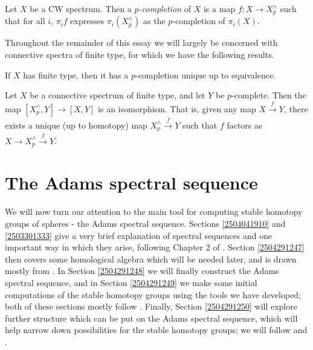 \documentclass{MetricNotes2023}
\begin{document}
\begin{definition}
Let \(X\) be a CW spectrum. Then a \textit{\(p\)-completion} of \(X\) is a map \(f : X \to X^\wedge_p\) such that for all \(i\), \(\pi_if\) expresses \(\pi_i(X^\wedge_p)\) as the \(p\)-completion of \(\pi_i(X)\).
\end{definition}

Throughout the remainder of this essay we will largely be concerned with connective spectra of finite type, for which we have the following results.

\begin{theorem}
If \(X\) has finite type, then it has a \(p\)-completion unique up to equivalence. 
\end{theorem}

\begin{theorem}\label{2504180925}
Let \(X\) be a connective spectrum of finite type, and let \(Y\) be \(p\)-complete. Then the map \([X^\wedge_p, Y]\to [X, Y]\) is an isomorphism. That is, given any map \(X \xrightarrow{f} Y\), there exists a unique (up to homotopy) map \(X^\wedge_p \xrightarrow{\overline f} Y\) such that \(f\) factors as \(X \to X^\wedge_p \xrightarrow{\overline f} Y\). 
\end{theorem}

\section{The Adams spectral sequence}

We will now turn our attention to the main tool for computing stable homotopy groups of spheres - the Adams spectral sequence. Sections \ref{2504041910} and \ref{2503301333} give a very brief explanation of spectral sequences and one important way in which they arise, following Chapter 2 of \autocite{spectral_sequences}. Section \ref{2504291247} then covers some homological algebra which will be needed later, and is drawn mostly from \autocite{weibel}. In Section \ref{2504291248} we will finally construct the Adams spectral sequence, and in Section \ref{2504291249} we make some initial computations of the stable homotopy groups using the tools we have developed; both of these sections mostly follow \autocite{hatcher5}. Finally, Section \ref{2504291250} will explore further structure which can be put on the Adams spectral sequence, which will help narrow down possibilities for the stable homotopy groups; we will follow \autocite{ass} and \autocite{rognes2}. 
\end{document}
